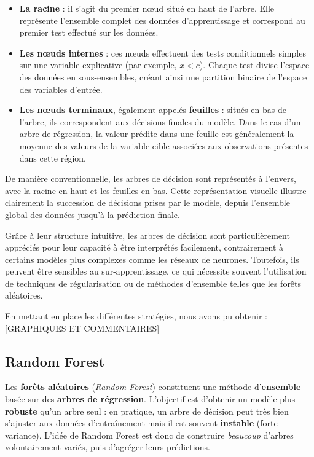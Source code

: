 \documentclass{article}
\theoremstyle{nopointbreak}
\theoremstyle{nobrkbold}
\begin{document}
\begin{itemize}
    \item \textbf{La racine} : il s’agit du premier nœud situé en haut de l’arbre. Elle représente l’ensemble complet des données d’apprentissage et correspond au premier test effectué sur les données.
    
    \item \textbf{Les nœuds internes} : ces nœuds effectuent des tests conditionnels simples sur une variable explicative (par exemple, $x < c$). Chaque test divise l’espace des données en sous-ensembles, créant ainsi une partition binaire de l’espace des variables d’entrée.
    
    \item \textbf{Les nœuds terminaux}, également appelés \textbf{feuilles} : situés en bas de l’arbre, ils correspondent aux décisions finales du modèle. Dans le cas d’un arbre de régression, la valeur prédite dans une feuille est généralement la moyenne des valeurs de la variable cible associées aux observations présentes dans cette région.
\end{itemize}

De manière conventionnelle, les arbres de décision sont représentés à l’envers, avec la racine en haut et les feuilles en bas. Cette représentation visuelle illustre clairement la succession de décisions prises par le modèle, depuis l’ensemble global des données jusqu’à la prédiction finale.

Grâce à leur structure intuitive, les arbres de décision sont particulièrement appréciés pour leur capacité à être interprétés facilement, contrairement à certains modèles plus complexes comme les réseaux de neurones. Toutefois, ils peuvent être sensibles au sur-apprentissage, ce qui nécessite souvent l’utilisation de techniques de régularisation ou de méthodes d’ensemble telles que les forêts aléatoires.




En mettant en place les différentes stratégies, nous avons pu obtenir : \\


[GRAPHIQUES ET COMMENTAIRES] \\



\subsection{Random Forest}
\label{subsec:rf}

Les \textbf{forêts aléatoires} (\textit{Random Forest}) constituent une méthode d'\textbf{ensemble} basée sur des \textbf{arbres de régression}. L’objectif est d’obtenir un modèle plus \textbf{robuste} qu’un arbre seul : en pratique, un arbre de décision peut très bien s’ajuster aux données d’entraînement mais il est souvent \textbf{instable} (forte variance). L’idée de Random Forest est donc de construire \emph{beaucoup} d’arbres volontairement variés, puis d’agréger leurs prédictions.
\end{document}
